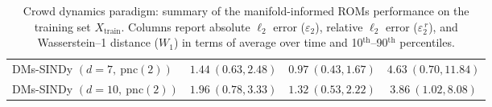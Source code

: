 \documentclass{article}
\begin{document}
\begin{table}[ht]
{\begin{tabularx}{\textwidth}{lCCC}
DMs-SINDy $(d=7,\ \mathrm{pnc}(2))$ 
& $1.44~(0.63,2.48)$ 
& $0.97~(0.43,1.67)$ 
& $4.63~(0.70,11.84)$ \\

DMs-SINDy $(d=10,\ \mathrm{pnc}(2))$ 
& $1.96~(0.78,3.33)$ 
& $1.32~(0.53,2.22)$ 
& $3.86~(1.02,8.08)$ \\
\bottomrule
\end{tabularx}
} %
\caption{Crowd dynamics paradigm: summary of the manifold-informed ROMs performance on the training set \(X_{\text{train}}\). Columns report absolute $\ell_2$ error ($\varepsilon_2$), relative $\ell_2$ error ($\varepsilon_2^{\,r}$), and Wasserstein--1 distance ($W_1$) in terms of average over time and 10$^{\text{th}}$–90$^{\text{th}}$ percentiles.}
\label{tab:rom_metrics_train}
\end{table}
\end{document}
